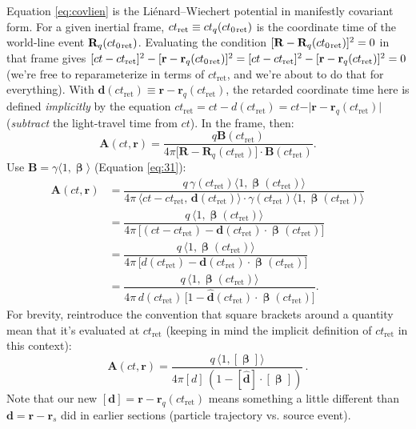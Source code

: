 \documentclass[12pt]{article}
\renewcommand{\vv}[1]{\mathbf{#1}}
\newcommand{\vvbeta}{\bm{\upbeta}}
\begin{document}
Equation \ref{eq:covlien} is the Li\'enard--Wiechert potential in manifestly covariant form. For a given inertial frame, $ct_{\mathrm{ret}} \equiv ct_{q} (ct_{0 \mkern2mu \textrm{ret}})$ is the coordinate time of the world-line event $\vv R_{q}(ct_{0 \mkern2mu \textrm{ret}})$. Evaluating the condition $[\vv R - \vv R_{q}(ct_{0 \mkern2mu \textrm{ret}})]^2 = 0$ in that frame gives $[ct - ct_{\mathrm{ret}}]^2 - [\vv r - \vv r_{q}(ct_{0 \mkern2mu \textrm{ret}})]^2 = [ct - ct_{\mathrm{ret}}]^2 - [\vv r - \vv r_{q}(ct_{\mathrm{ret}})]^2 = 0$ (we're free to reparameterize in terms of $ct_{\mathrm{ret}}$, and we're about to do that for everything). With $\vv d(ct_{\mathrm{ret}}) \equiv \vv r - \vv r_{q}(ct_{\mathrm{ret}})$, the retarded coordinate time here is defined \emph{implicitly} by the equation $ct_{\mathrm{ret}} = ct - d(ct_{\mathrm{ret}}) = ct - \vert \vv r - \vv r_{q}(ct_{\mathrm{ret}}) \vert$ (\emph{subtract} the light-travel time from $ct$). In the frame, then:
\begin{equation*}
\vv A(ct, \vv r) = \dfrac{q \vv B(ct_{\textrm{ret}})}{4 \pi \big[ \vv R - \vv R_{q} (ct_{\textrm{ret}}) \big] \cdot \vv B (ct_{\textrm{ret}})} .
\end{equation*}
Use $\vv B = \gamma \langle 1, \vvbeta \rangle$ (Equation \ref{eq:31}):
\begin{equation*}
\begin{aligned}
\vv A(ct, \vv r) &= \dfrac{q \, \gamma(ct_{\textrm{ret}}) \big \langle 1, \vvbeta(ct_{\textrm{ret}}) \big \rangle}{4 \pi \, \big \langle ct - ct_{\mathrm{ret}}, \, \vv d (ct_{\mathrm{ret}}) \big \rangle \cdot \gamma(ct_{\textrm{ret}}) \big \langle 1, \vvbeta(ct_{\textrm{ret}}) \big \rangle} \\[4pt]
&= \dfrac{q \, \big \langle 1, \vvbeta(ct_{\textrm{ret}}) \big \rangle}{4 \pi \, \big[ (ct - ct_{\textrm{ret}}) - \vv d (ct_{\mathrm{ret}}) \cdot \vvbeta(ct_{\textrm{ret}}) \big] } \\[4pt]
&= \dfrac{q \, \big \langle 1, \vvbeta(ct_{\textrm{ret}}) \big \rangle}{4 \pi \, \big[ d (ct_{\mathrm{ret}}) - \vv d (ct_{\mathrm{ret}}) \cdot \vvbeta(ct_{\textrm{ret}}) \big] } \\[4pt]
&= \dfrac{q \, \big \langle 1, \vvbeta(ct_{\textrm{ret}}) \big \rangle}{4 \pi \, d (ct_{\textrm{ret}}) \, \big[1 - \vv{\hat{d}} (ct_{\textrm{ret}}) \cdot \vvbeta (ct_{\textrm{ret}}) \big]} .
\end{aligned}
\end{equation*}
For brevity, reintroduce the convention that square brackets around a quantity mean that it's evaluated at $ct_{\textrm{ret}}$ (keeping in mind the implicit definition of $ct_{\textrm{ret}}$ in this context):
\begin{equation}\label{eq:lienard}
\boxed{ \vv A(ct, \vv r) = \dfrac{q \, \big \langle 1, [\vvbeta] \big \rangle}{4 \pi [d] \, (1 - [\vv{\hat{d}}] \cdot [\vvbeta] )} } \, .
\end{equation}
Note that our new $[\vv d] = \vv r - \vv r_q(ct_{\mathrm{ret}})$ means something a little different than $\vv d = \vv r - \vv r_s$ did in earlier sections (particle trajectory vs. source event).
\end{document}

